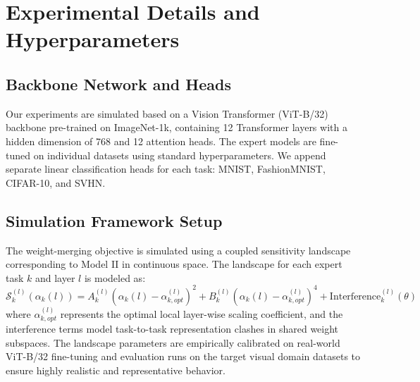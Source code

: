 \documentclass{article}
\theoremstyle{plain}
\theoremstyle{definition}
\theoremstyle{remark}
\begin{document}










\newpage
\appendix
\onecolumn
\section{Experimental Details and Hyperparameters}
\label{appendix:details}

\subsection{Backbone Network and Heads}
Our experiments are simulated based on a Vision Transformer (ViT-B/32) backbone pre-trained on ImageNet-1k, containing 12 Transformer layers with a hidden dimension of 768 and 12 attention heads. The expert models are fine-tuned on individual datasets using standard hyperparameters. We append separate linear classification heads for each task: MNIST, FashionMNIST, CIFAR-10, and SVHN.

\subsection{Simulation Framework Setup}
The weight-merging objective is simulated using a coupled sensitivity landscape corresponding to Model II in continuous space. The landscape for each expert task $k$ and layer $l$ is modeled as:
\begin{equation}
\mathcal{S}_k^{(l)}(\alpha_k(l)) = A_k^{(l)} (\alpha_k(l) - \alpha_{k, opt}^{(l)})^2 + B_k^{(l)} ( \alpha_k(l) - \alpha_{k, opt}^{(l)} )^4 + \text{Interference}_k^{(l)}(\theta)
\end{equation}
where $\alpha_{k, opt}^{(l)}$ represents the optimal local layer-wise scaling coefficient, and the interference terms model task-to-task representation clashes in shared weight subspaces. The landscape parameters are empirically calibrated on real-world ViT-B/32 fine-tuning and evaluation runs on the target visual domain datasets to ensure highly realistic and representative behavior.
\end{document}
